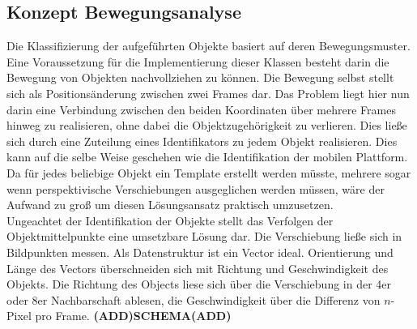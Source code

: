 \subsection{Konzept Bewegungsanalyse}
Die Klassifizierung der aufgeführten Objekte basiert auf deren Bewegungsmuster. Eine Voraussetzung für die Implementierung dieser Klassen besteht darin die Bewegung von Objekten nachvollziehen zu können. Die Bewegung selbst stellt sich als Positionsänderung zwischen zwei Frames dar. Das Problem liegt hier nun darin eine Verbindung zwischen den beiden Koordinaten über mehrere Frames hinweg zu realisieren, ohne dabei die Objektzugehörigkeit zu verlieren. Dies ließe sich durch eine Zuteilung eines Identifikators zu jedem Objekt realisieren. Dies kann auf die selbe Weise geschehen wie die Identifikation der mobilen Plattform. Da für jedes beliebige Objekt ein Template erstellt werden müsste, mehrere sogar wenn perspektivische Verschiebungen ausgeglichen werden müssen, wäre der Aufwand zu groß um diesen Lösungsansatz praktisch umzusetzen.\\ Ungeachtet der Identifikation der Objekte stellt das Verfolgen der Objektmittelpunkte eine umsetzbare Lösung dar. Die Verschiebung ließe sich in Bildpunkten messen. Als Datenstruktur ist ein Vector ideal. Orientierung und Länge des Vectors überschneiden sich mit Richtung und Geschwindigkeit des Objekts. Die Richtung des Objects liese sich über die Verschiebung in der 4er oder 8er Nachbarschaft ablesen, die Geschwindigkeit über die Differenz von $n$-Pixel pro Frame.
\textbf{(ADD)SCHEMA(ADD)}
